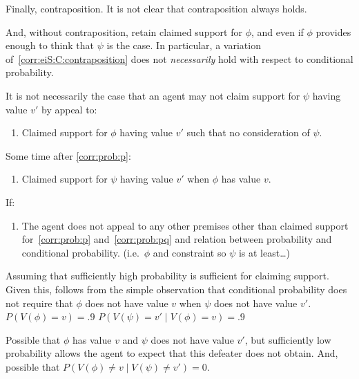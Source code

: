 \begin{note}
  Finally, contraposition.
  It is not clear that contraposition always holds.

  And, without contraposition, retain claimed support for \(\phi\), and even if \mom{} \(\phi\) provides enough to think that \(\psi\) is the case.
  In particular, a variation of~\ref{corr:eiS:C:contraposition} does not \emph{necessarily} hold with respect to conditional probability.

  \begin{conjecture}\label{conj:eiS:C:probability}
    It is not necessarily the case that an agent may not claim support for \(\psi\) having value \(v'\) by appeal to:
    \begin{enumerate}[label=\arabic*., ref=(\arabic*)]
    \item\label{corr:prob:p} Claimed support for \(\phi\) having value \(v'\) such that no consideration of \(\psi\).
    \end{enumerate}

    Some time after \ref{corr:prob:p}:

    \begin{enumerate}[resume]
  \item\label{corr:prob:pq} Claimed support for \(\psi\) having value \(v'\) when \(\phi\) has value \(v\).
    \end{enumerate}

    If:
    \begin{enumerate}[resume]
    \item The agent does not appeal to any other premises other than claimed support for~\ref{corr:prob:p} and~\ref{corr:prob:pq} and relation between probability and conditional probability.
      (i.e.\ \(\phi\) and constraint so \(\psi\) is at least\dots)
    \end{enumerate}
    \vspace{-\baselineskip}
  \end{conjecture}

  Assuming that sufficiently high probability is sufficient for claiming support.
  Given this, follows from the simple observation that conditional probability does not require that \(\phi\) does not have value \(v\) when \(\psi\) does not have value \(v'\).
  \(P(V(\phi) = v) = .9\)
  \(P(V(\psi) = v' \mid V(\phi) = v) = .9\)

  Possible that \(\phi\) has value \(v\) and \(\psi\) does not have value \(v'\), but sufficiently low probability allows the agent to expect that this defeater does not obtain.
  And, possible that \(P(V(\phi) \ne v \mid V(\psi) \ne v') = 0\).


\end{note}
